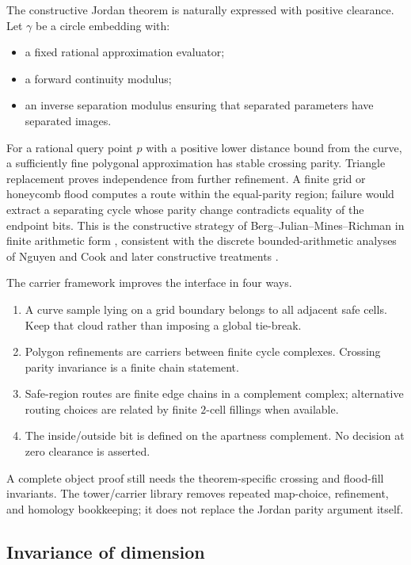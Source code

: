 The constructive Jordan theorem is naturally expressed with positive clearance.  Let $\gamma$ be a circle embedding with:
\begin{itemize}
  \item a fixed rational approximation evaluator;
  \item a forward continuity modulus;
  \item an inverse separation modulus ensuring that separated parameters have separated images.
\end{itemize}
For a rational query point $p$ with a positive lower distance bound from the curve, a sufficiently fine polygonal approximation has stable crossing parity.  Triangle replacement proves independence from further refinement.  A finite grid or honeycomb flood computes a route within the equal-parity region; failure would extract a separating cycle whose parity change contradicts equality of the endpoint bits.  This is the constructive strategy of Berg--Julian--Mines--Richman in finite arithmetic form \cite{Berg1975}, consistent with the discrete bounded-arithmetic analyses of Nguyen and Cook \cite{NguyenCook} and later constructive treatments \cite{Bridges2025}.

The carrier framework improves the interface in four ways.

\begin{enumerate}
  \item A curve sample lying on a grid boundary belongs to all adjacent safe cells.  Keep that cloud rather than imposing a global tie-break.
  \item Polygon refinements are carriers between finite cycle complexes.  Crossing parity invariance is a finite chain statement.
  \item Safe-region routes are finite edge chains in a complement complex; alternative routing choices are related by finite $2$-cell fillings when available.
  \item The inside/outside bit is defined on the apartness complement.  No decision at zero clearance is asserted.
\end{enumerate}

A complete object proof still needs the theorem-specific crossing and flood-fill invariants.  The tower/carrier library removes repeated map-choice, refinement, and homology bookkeeping; it does not replace the Jordan parity argument itself.

\subsection{Invariance of dimension}

